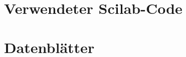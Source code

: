%
\section{Verwendeter Scilab-Code}
\label{app:Scilab}
%
\lipsum[5-6]
%
%
%
%
\begin{flushright}
  \textit{\autorA}
\end{flushright}
%
%
%
\newpage
\section{Datenblätter}
\label{app:Datenblätter}
%
\lipsum[7-9]
%
%
%
%
\begin{flushright}
  \textit{\autorA}
\end{flushright}
%
%
%